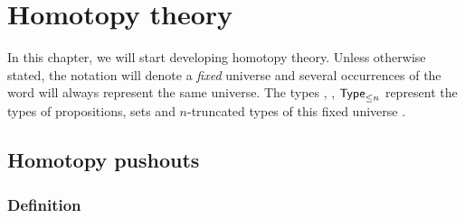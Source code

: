 
\newcommand{\typele}[1]{\ensuremath{\type_{\le #1}}\xspace}
\newcommand{\function}[4]{\left\{\begin{array}{rcl}#1 &
      \longrightarrow & #2 \\ #3 & \longmapsto & #4 \end{array}\right.}
\newcommand{\anhprop}{a mere proposition\xspace}
\newcommand{\hprops}{mere propositions\xspace}


\renewcommand{\P}{\ensuremath{\mathsf{P}}\xspace}
\newcommand{\cocone}[2]{\mathrm{cocone}_{#1}(#2)}
\newcommand{\Ddiag}{\mathscr{D}}
\newcommand{\glue}{\mathsf{glue}}
\newcommand{\cone}[2]{\mathrm{cone}_{#1}(#2)}
\newcommand{\reflect}{\mathsf{r}}
\newcommand{\project}{\mathsf{p}}
\newcommand{\ext}{\mathsf{ext}}
\newcommand{\tproj}{\mathsf{proj}}
\newcommand{\extendsmb}{\mathsf{ext}}
\newcommand{\extend}[1]{\extendsmb(#1)}
\newcommand{\composecocone}[2]{#1\circ#2}
\newcommand{\composecone}[2]{#2\circ#1}

\chapter{Homotopy theory}
\label{cha:homotopy}

In this chapter, we will start developing homotopy theory. Unless otherwise
stated, the notation \type will denote a \emph{fixed} universe and several
occurrences of the word \type will always represent the same universe. The types
\prop, \set, \typele{n} represent the types of propositions, sets and
$n$-truncated types of this fixed universe \type.

\section{Homotopy pushouts}
\label{sec:pushouts}

\subsection{Definition}
\label{sec:push:definition}

